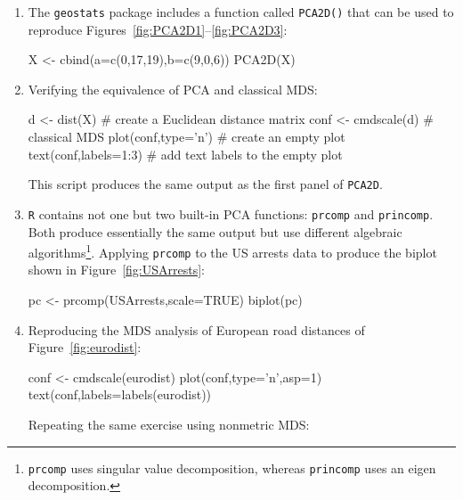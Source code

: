 \begin{enumerate}

\item The \texttt{geostats} package includes a function called
  \texttt{PCA2D()} that can be used to reproduce
  Figures~\ref{fig:PCA2D1}--\ref{fig:PCA2D3}:

\begin{script}
X <- cbind(a=c(0,17,19),b=c(9,0,6))
PCA2D(X)
\end{script}

\item Verifying the equivalence of PCA and classical MDS:

\begin{script}[firstnumber=3]
d <- dist(X)           # create a Euclidean distance matrix
conf <- cmdscale(d)    # classical MDS
plot(conf,type='n')    # create an empty plot
text(conf,labels=1:3)  # add text labels to the empty plot
\end{script}

This script produces the same output as the first panel of
\texttt{PCA2D}.

\item \texttt{R} contains not one but two built-in PCA functions:
  \texttt{prcomp} and \texttt{princomp}. Both produce essentially the
  same output but use different algebraic
  algorithms\footnote{\texttt{prcomp} uses singular value
  decomposition, whereas \texttt{princomp} uses an eigen
  decomposition.}. Applying \texttt{prcomp} to the US arrests data to
  produce the biplot shown in Figure~\ref{fig:USArrests}:

\begin{script}
pc <- prcomp(USArrests,scale=TRUE)
biplot(pc)
\end{script}

\item Reproducing the MDS analysis of European road distances of
  Figure~\ref{fig:eurodist}:

\begin{script}
conf <- cmdscale(eurodist)
plot(conf,type='n',asp=1)
text(conf,labels=labels(eurodist))
\end{script}

Repeating the same exercise using nonmetric MDS:



\end{enumerate}
